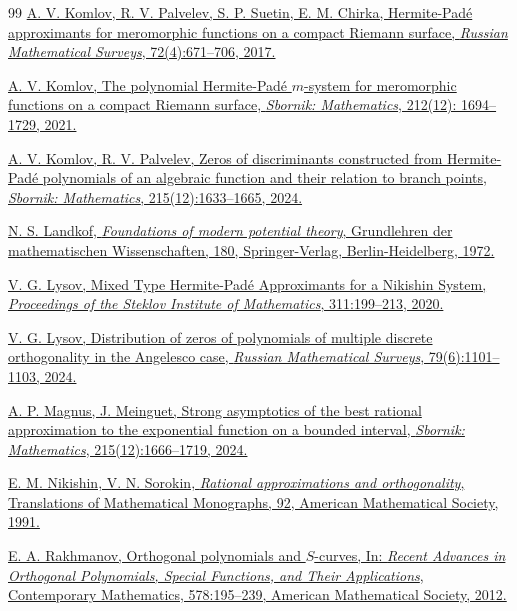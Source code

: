 \documentclass[11pt, a4paper, twoside]{article}
\theoremstyle{plain}
\theoremstyle{definition}
\begin{document}
\begin{thebibliography}{99}
 \href{https://www.mathnet.ru/eng/umn9786}{A. V. Komlov, R. V. Palvelev, S. P. Suetin, E. M. Chirka, Hermite-Padé approximants for meromorphic functions on a compact Riemann surface, \textit{Russian Mathematical Surveys}, 72(4):671--706, 2017.}

 \href{https://www.mathnet.ru/eng/msb9577}{A. V. Komlov, The polynomial Hermite-Padé $m$-system for meromorphic functions on a compact Riemann surface, \textit{Sbornik: Mathematics}, 212(12): 1694--1729, 2021.}

 \href{https://www.mathnet.ru/eng/msb10114}{A. V. Komlov, R. V. Palvelev, Zeros of discriminants constructed from Hermite-Padé polynomials of an algebraic function and their relation to branch points, \textit{Sbornik: Mathematics}, 215(12):1633--1665, 2024.}

 \href{https://link.springer.com/book/9783642651854}{N. S. Landkof, \textit{Foundations of modern potential theory}, Grundlehren der mathematischen Wissenschaften, 180, Springer-Verlag, Berlin-Heidelberg, 1972.}

 \href{https://www.mathnet.ru/eng/tm4146}{V. G. Lysov, Mixed Type Hermite-Padé Approximants for a Nikishin System, \textit{Proceedings of the Steklov Institute of Mathematics}, 311:199--213, 2020.}

 \href{https://www.mathnet.ru/eng/umn10214}{V. G. Lysov, Distribution of zeros of polynomials of multiple discrete orthogonality in the Angelesco case, \textit{Russian Mathematical Surveys}, 79(6):1101--1103, 2024.}

 \href{https://www.mathnet.ru/eng/msb8815}{A. P. Magnus, J. Meinguet, Strong asymptotics of the best rational approximation to the exponential function on a bounded interval, \textit{Sbornik: Mathematics}, 215(12):1666--1719, 2024.}

 \href{https://bookstore.ams.org/mmono-92}{E. M. Nikishin, V. N. Sorokin, \textit{Rational approximations and orthogonality}, Translations of Mathematical Monographs, 92, American Mathematical Society, 1991.}

 \href{https://doi.org/10.1090/conm/578}{E. A. Rakhmanov, Orthogonal polynomials and $S$-curves, In: \textit{Recent Advances in Orthogonal Polynomials, Special Functions, and Their Applications}, Contemporary Mathematics, 578:195--239, American Mathematical Society, 2012.}


\end{thebibliography}
\end{document}
